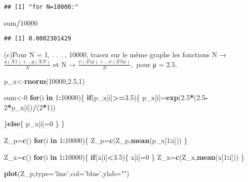 \documentclass[]{article}
\newenvironment{Shaded}{\begin{snugshade}}{\end{snugshade}}
\newcommand{\KeywordTok}[1]{\textcolor[rgb]{0.13,0.29,0.53}{\textbf{#1}}}
\newcommand{\DataTypeTok}[1]{\textcolor[rgb]{0.13,0.29,0.53}{#1}}
\newcommand{\DecValTok}[1]{\textcolor[rgb]{0.00,0.00,0.81}{#1}}
\newcommand{\FloatTok}[1]{\textcolor[rgb]{0.00,0.00,0.81}{#1}}
\newcommand{\StringTok}[1]{\textcolor[rgb]{0.31,0.60,0.02}{#1}}
\newcommand{\ControlFlowTok}[1]{\textcolor[rgb]{0.13,0.29,0.53}{\textbf{#1}}}
\newcommand{\OperatorTok}[1]{\textcolor[rgb]{0.81,0.36,0.00}{\textbf{#1}}}
\newcommand{\NormalTok}[1]{#1}
\begin{document}
\begin{verbatim}
## [1] "for N=10000:"
\end{verbatim}

\begin{Shaded}
\begin{Highlighting}[]
\NormalTok{sum}\OperatorTok{/}\DecValTok{10000}
\end{Highlighting}
\end{Shaded}

\begin{verbatim}
## [1] 0.0002301429
\end{verbatim}

(c)Pour N = 1, . . . , 10000, tracez sur le même graphe les fonctions N
→ \(\frac{g(X1 )+...g(XN )}{N}\) et N →
\(\frac{\psi(Z1μ)+...\psi(ZNμ )}{N},\) pour μ = 2.5.

\begin{Shaded}
\begin{Highlighting}[]
\NormalTok{p_x<-}\KeywordTok{rnorm}\NormalTok{(}\DecValTok{10000}\NormalTok{,}\FloatTok{2.5}\NormalTok{,}\DecValTok{1}\NormalTok{)}

\NormalTok{sum<-}\DecValTok{0}
\ControlFlowTok{for}\NormalTok{(i }\ControlFlowTok{in} \DecValTok{1}\OperatorTok{:}\DecValTok{10000}\NormalTok{)\{}
  \ControlFlowTok{if}\NormalTok{(p_x[i]}\OperatorTok{>=}\FloatTok{3.5}\NormalTok{)\{}
\NormalTok{    p_x[i]=}\KeywordTok{exp}\NormalTok{(}\FloatTok{2.5}\OperatorTok{*}\NormalTok{(}\FloatTok{2.5}\OperatorTok{-}\DecValTok{2}\OperatorTok{*}\NormalTok{p_x[i])}\OperatorTok{/}\NormalTok{(}\DecValTok{2}\OperatorTok{*}\DecValTok{1}\NormalTok{))}
  
    
\NormalTok{  \}}\ControlFlowTok{else}\NormalTok{\{}
\NormalTok{    p_x[i]=}\DecValTok{0}
\NormalTok{  \}}
\NormalTok{\}}

\NormalTok{Z_p=}\KeywordTok{c}\NormalTok{()}
\ControlFlowTok{for}\NormalTok{(i }\ControlFlowTok{in} \DecValTok{1}\OperatorTok{:}\DecValTok{10000}\NormalTok{)\{}
\NormalTok{  Z_p=}\KeywordTok{c}\NormalTok{(Z_p,}\KeywordTok{mean}\NormalTok{(p_x[}\DecValTok{1}\OperatorTok{:}\NormalTok{i]))}
\NormalTok{\}}

\NormalTok{Z_x=}\KeywordTok{c}\NormalTok{()}
\ControlFlowTok{for}\NormalTok{(i }\ControlFlowTok{in} \DecValTok{1}\OperatorTok{:}\DecValTok{10000}\NormalTok{)\{}
  \ControlFlowTok{if}\NormalTok{(x[i]}\OperatorTok{<}\FloatTok{3.5}\NormalTok{)\{}
\NormalTok{    x[i]=}\DecValTok{0}
\NormalTok{  \}}
\NormalTok{  Z_x=}\KeywordTok{c}\NormalTok{(Z_x,}\KeywordTok{mean}\NormalTok{(x[}\DecValTok{1}\OperatorTok{:}\NormalTok{i]))}
\NormalTok{\}}

\KeywordTok{plot}\NormalTok{(Z_p,}\DataTypeTok{type=}\StringTok{'line'}\NormalTok{,}\DataTypeTok{col=}\StringTok{'blue'}\NormalTok{,}\DataTypeTok{ylab=}\StringTok{""}\NormalTok{)}
\end{Highlighting}
\end{Shaded}
\end{document}
